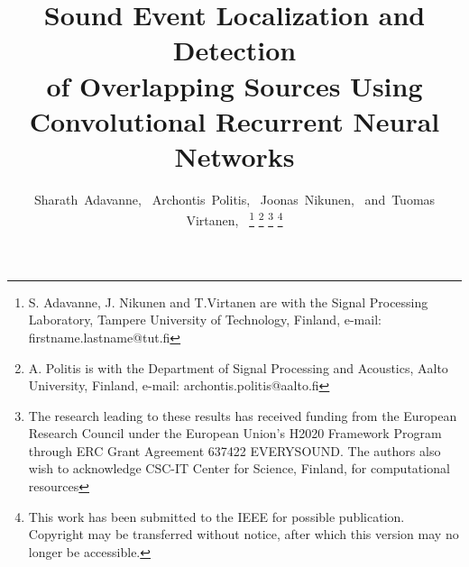 \documentclass[journal]{IEEEtran}
\begin{document}
\title{Sound Event Localization and Detection \\of Overlapping Sources Using\\ Convolutional Recurrent Neural Networks}
\author{Sharath~Adavanne,~
        Archontis~Politis,~
        Joonas~Nikunen,~
        and~Tuomas Virtanen,~%
\thanks{S. Adavanne, J. Nikunen and T.Virtanen are with the Signal Processing Laboratory, Tampere University of Technology, Finland, e-mail: firstname.lastname@tut.fi}%
\thanks{A. Politis is with the Department of Signal Processing and Acoustics, Aalto University, Finland, e-mail: archontis.politis@aalto.fi}%
\thanks{The research leading to these results has received funding from the European Research Council under the European Union’s H2020 Framework Program through ERC Grant Agreement 637422 EVERYSOUND. The authors also wish to acknowledge CSC-IT Center for Science, Finland, for computational resources}
\thanks{This work has been submitted to the IEEE for possible publication. Copyright may be transferred without notice, after which this version may no longer be accessible.}
}

% 
\end{document}
